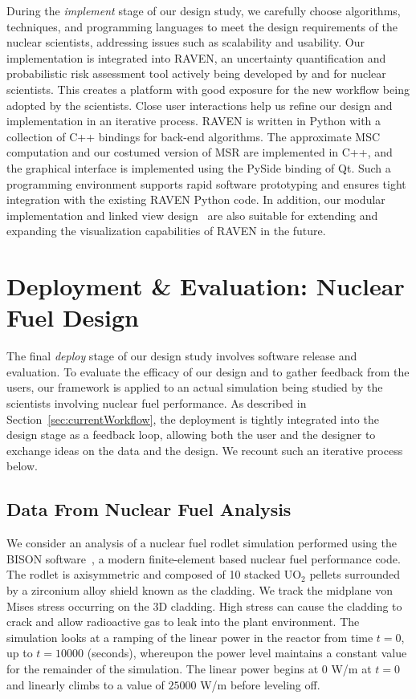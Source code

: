During the \emph{implement} stage of our design study, we carefully choose algorithms, techniques, and programming languages to meet the design requirements of the nuclear scientists, addressing issues such as scalability and usability.
%
Our implementation is integrated into RAVEN, an uncertainty quantification and probabilistic risk assessment tool actively being developed by and for nuclear scientists.
%
This creates a platform with good exposure for the new workflow being adopted by the scientists.
%
Close user interactions help us refine our design and implementation in an iterative process.
%
RAVEN is written in Python with a collection of C++ bindings for back-end algorithms.
%
The approximate MSC computation and our costumed version of MSR are implemented in C++, and the graphical interface is implemented using the PySide binding of Qt.
%
Such a programming environment supports rapid software prototyping and ensures tight integration with the existing RAVEN Python code.
%
In addition, our modular implementation and linked view design~\cite{Roberts2007}  are also suitable for extending and expanding the visualization capabilities of RAVEN in the future.

\section{Deployment \& Evaluation: Nuclear Fuel Design}
\label{sec:saApplication}
The final \emph{deploy} stage of our design study involves software release and evaluation.
%
To evaluate the efficacy of our design and to gather feedback from the users, our framework is applied to an actual simulation being studied by the scientists involving nuclear fuel performance.
%
As described in Section~\ref{sec:currentWorkflow}, the deployment is tightly integrated into the design stage as a feedback loop, allowing both the user and the designer to exchange ideas on the data and the design.
%
We recount such an iterative process below.

\subsection{Data From Nuclear Fuel Analysis}
\label{sec:applicationBackground}
We consider an analysis of a nuclear fuel rodlet simulation performed using the BISON software~\cite{HalesNovasconePastore2013}, a modern finite-element based nuclear fuel performance code.
%
The rodlet is axisymmetric and composed of 10 stacked UO$_2$ pellets surrounded by a zirconium alloy shield known as the cladding.
%
We track the midplane von Mises stress occurring on the 3D
cladding.
%
High stress can cause the cladding to crack and allow radioactive gas to leak into the plant environment.
%
The simulation looks at a ramping of the linear power in the reactor from time $t=0$, up to $t=10000$ (seconds), whereupon the power level maintains a constant value for the remainder of the simulation.
%
The linear power begins at $0$ W/m at $t=0$ and linearly climbs to a value of $25000$ W/m before leveling off.

